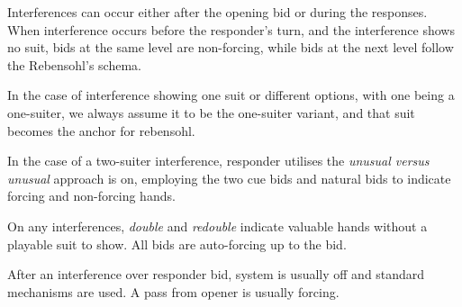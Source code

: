 Interferences can occur either after the \bid{1\CS} opening bid or during the responses. When interference occurs before the responder's turn, and the interference shows no suit, bids at the same level are non-forcing, while bids at the next level follow the Rebensohl's schema.

In the case of interference showing one suit or different options, with one being a one-suiter, we always assume it to be the one-suiter variant, and that suit becomes the anchor for rebensohl.

In the case of a two-suiter interference, responder utilises the \emph{unusual versus unusual} approach is on, employing the two cue bids and natural bids to indicate forcing and non-forcing hands.

On any interferences, \emph{double} and \emph{redouble} indicate valuable hands without a play\-able suit to show. All bids are auto-forcing up to the \bid{2\SpS} bid.

After an interference over responder bid, system is usually off and standard mechanisms are used. A pass from opener is usually forcing.